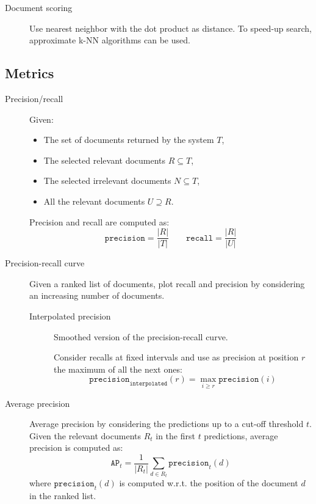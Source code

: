 \begin{description}
        \begin{description}
            \item[Document scoring]
                Use nearest neighbor with the dot product as distance. To speed-up search, approximate k-NN algorithms can be used.
        \end{description}
\end{description}


\subsection{Metrics}

\begin{description}
    \item[Precision/recall] 
        Given:
        \begin{itemize}
            \item The set of documents returned by the system $T$,
            \item The selected relevant documents $R \subseteq T$,
            \item The selected irrelevant documents $N \subseteq T$,
            \item All the relevant documents $U \supseteq R$.
        \end{itemize}
        Precision and recall are computed as:
        \[ 
            \texttt{precision} = \frac{|R|}{|T|} 
            \qquad
            \texttt{recall} = \frac{|R|}{|U|} 
        \]

    \item[Precision-recall curve] 
        Given a ranked list of documents, plot recall and precision by considering an increasing number of documents.

        \begin{description}
            \item[Interpolated precision]
                Smoothed version of the precision-recall curve.

                Consider recalls at fixed intervals and use as precision at position $r$ the maximum of all the next ones:
                \[ \texttt{precision}_\texttt{interpolated}(r) = \max_{i \geq r} \texttt{precision}(i) \]
        \end{description}

    \item[Average precision] 
        Average precision by considering the predictions up to a cut-off threshold $t$. Given the relevant documents $R_t$ in the first $t$ predictions, average precision is computed as:
        \[ \texttt{AP}_t = \frac{1}{|R_t|} \sum_{d \in R_t} \texttt{precision}_t(d) \]
        where $\texttt{precision}_t(d)$ is computed w.r.t. the position of the document $d$ in the ranked list.


\end{description}

